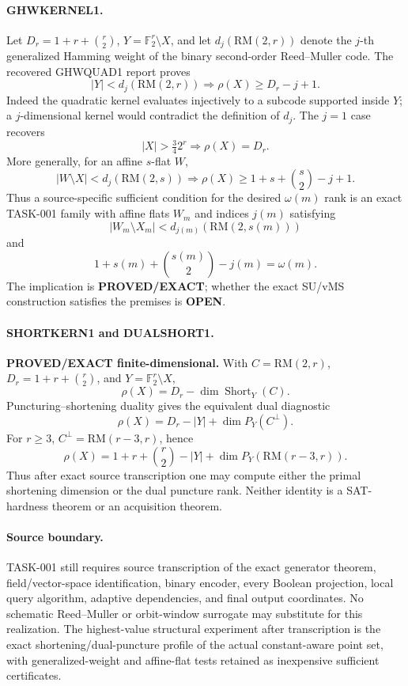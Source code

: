 \documentclass[11pt]{article}
\begin{document}
\paragraph{GHWKERNEL1.}
Let \(D_r=1+r+\binom r2\), \(Y=\mathbb F_2^r\setminus X\), and let \(d_j(\mathrm{RM}(2,r))\) denote the \(j\)-th generalized Hamming weight of the binary second-order Reed--Muller code.  The recovered GHWQUAD1 report proves
\[
 \boxed{
 |Y|<d_j(\mathrm{RM}(2,r))
 \Longrightarrow
 \rho(X)\ge D_r-j+1.
 }
\]
Indeed the quadratic kernel evaluates injectively to a subcode supported inside \(Y\); a \(j\)-dimensional kernel would contradict the definition of \(d_j\).  The \(j=1\) case recovers
\[
 |X|>\tfrac34 2^r\Longrightarrow \rho(X)=D_r.
\]
More generally, for an affine \(s\)-flat \(W\),
\[
 |W\setminus X|<d_j(\mathrm{RM}(2,s))
 \Longrightarrow
 \rho(X)\ge1+s+\binom s2-j+1.
\]
Thus a source-specific sufficient condition for the desired \(\omega(m)\) rank is an exact TASK-001 family with affine flats \(W_m\) and indices \(j(m)\) satisfying
\[
 |W_m\setminus X_m|<d_{j(m)}(\mathrm{RM}(2,s(m)))
\]
and
\[
 1+s(m)+\binom{s(m)}2-j(m)=\omega(m).
\]
The implication is \textbf{PROVED/EXACT}; whether the exact SU/vMS construction satisfies the premises is \textbf{OPEN}.

\paragraph{SHORTKERN1 and DUALSHORT1.}
\textbf{PROVED/EXACT finite-dimensional.}  With \(C=\mathrm{RM}(2,r)\), \(D_r=1+r+\binom r2\), and \(Y=\mathbb F_2^r\setminus X\),
\[
 \rho(X)=D_r-\dim\operatorname{Short}_Y(C).
\]
Puncturing--shortening duality gives the equivalent dual diagnostic
\[
 \boxed{\rho(X)=D_r-|Y|+\dim P_Y(C^\perp).}
\]
For \(r\ge3\), \(C^\perp=\mathrm{RM}(r-3,r)\), hence
\[
 \boxed{
 \rho(X)=1+r+\binom r2-|Y|+
 \dim P_Y\!\left(\mathrm{RM}(r-3,r)\right).
 }
\]
Thus after exact source transcription one may compute either the primal shortening dimension or the dual puncture rank.  Neither identity is a SAT-hardness theorem or an acquisition theorem.

\paragraph{Source boundary.}
TASK-001 still requires source transcription of the exact generator theorem, field/vector-space identification, binary encoder, every Boolean projection, local query algorithm, adaptive dependencies, and final output coordinates.  No schematic Reed--Muller or orbit-window surrogate may substitute for this realization.  The highest-value structural experiment after transcription is the exact shortening/dual-puncture profile of the actual constant-aware point set, with generalized-weight and affine-flat tests retained as inexpensive sufficient certificates.
\end{document}
